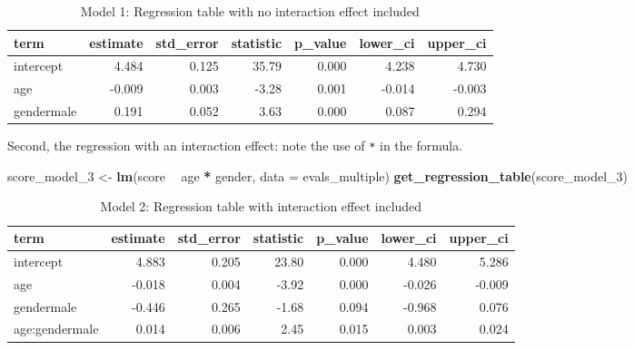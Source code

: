 \documentclass[12pt,]{krantz}
\makeatletter
\newenvironment{Shaded}{\begin{snugshade}}{\end{snugshade}}
\newcommand{\KeywordTok}[1]{\textcolor[rgb]{0.27,0.27,0.27}{\textbf{#1}}}
\newcommand{\DataTypeTok}[1]{\textcolor[rgb]{0.27,0.27,0.27}{#1}}
\newcommand{\DecValTok}[1]{\textcolor[rgb]{0.06,0.06,0.06}{#1}}
\newcommand{\StringTok}[1]{\textcolor[rgb]{0.5,0.5,0.5}{#1}}
\newcommand{\OperatorTok}[1]{\textcolor[rgb]{0.43,0.43,0.43}{\textbf{#1}}}
\newcommand{\NormalTok}[1]{#1}
\newenvironment{kframe}{%
\medskip{}
\setlength{\fboxsep}{.8em}
 \def\at@end@of@kframe{}%
 \ifinner\ifhmode%
  \def\at@end@of@kframe{\end{minipage}}%
  \begin{minipage}{\columnwidth}%
 \fi\fi%
 \def\FrameCommand##1{\hskip\@totalleftmargin \hskip-\fboxsep
 \colorbox{shadecolor}{##1}\hskip-\fboxsep
     \hskip-\linewidth \hskip-\@totalleftmargin \hskip\columnwidth}%
 \MakeFramed {\advance\hsize-\width
   \@totalleftmargin\z@ \linewidth\hsize
   \@setminipage}}%
 {\par\unskip\endMakeFramed%
 \at@end@of@kframe}
\renewenvironment{Shaded}{\begin{kframe}}{\end{kframe}}
\theoremstyle{definition}
\theoremstyle{definition}
\theoremstyle{definition}
\theoremstyle{remark}
\makeatother
\begin{document}
\begin{table}[H]

\caption{\label{tab:modelmultireg}Model 1: Regression table with no interaction effect included}
\centering
\fontsize{10}{12}\selectfont
\begin{tabular}[t]{lrrrrrr}
\toprule
term & estimate & std\_error & statistic & p\_value & lower\_ci & upper\_ci\\
\midrule
intercept & 4.484 & 0.125 & 35.79 & 0.000 & 4.238 & 4.730\\
age & -0.009 & 0.003 & -3.28 & 0.001 & -0.014 & -0.003\\
gendermale & 0.191 & 0.052 & 3.63 & 0.000 & 0.087 & 0.294\\
\bottomrule
\end{tabular}
\end{table}

Second, the regression with an interaction effect: note the use of
\texttt{*} in the formula.

\begin{Shaded}
\begin{Highlighting}[]
\NormalTok{score_model_}\DecValTok{3}\NormalTok{ <-}\StringTok{ }\KeywordTok{lm}\NormalTok{(score }\OperatorTok{~}\StringTok{ }\NormalTok{age }\OperatorTok{*}\StringTok{ }\NormalTok{gender, }\DataTypeTok{data =}\NormalTok{ evals_multiple)}
\KeywordTok{get_regression_table}\NormalTok{(score_model_}\DecValTok{3}\NormalTok{)}
\end{Highlighting}
\end{Shaded}

\begin{table}[H]

\caption{\label{tab:unnamed-chunk-439}Model 2: Regression table with interaction effect included}
\centering
\fontsize{10}{12}\selectfont
\begin{tabular}[t]{lrrrrrr}
\toprule
term & estimate & std\_error & statistic & p\_value & lower\_ci & upper\_ci\\
\midrule
intercept & 4.883 & 0.205 & 23.80 & 0.000 & 4.480 & 5.286\\
age & -0.018 & 0.004 & -3.92 & 0.000 & -0.026 & -0.009\\
gendermale & -0.446 & 0.265 & -1.68 & 0.094 & -0.968 & 0.076\\
age:gendermale & 0.014 & 0.006 & 2.45 & 0.015 & 0.003 & 0.024\\
\bottomrule
\end{tabular}
\end{table}
\end{document}
